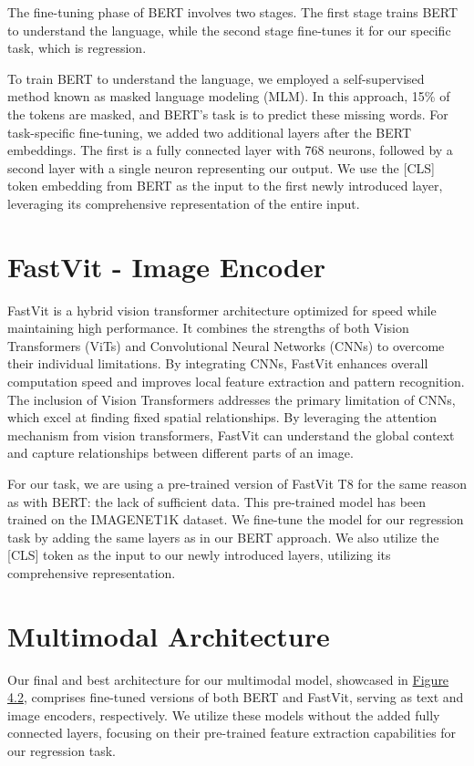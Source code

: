 The fine-tuning phase of BERT involves two stages. The first stage trains BERT to understand the language, while the second stage fine-tunes it for our specific task, which is regression.

To train BERT to understand the language, we employed a self-supervised method known as masked language modeling (MLM). In this approach, 15\% of the tokens are masked, and BERT's task is to predict these missing words. For task-specific fine-tuning, we added two additional layers after the BERT embeddings. The first is a fully connected layer with 768 neurons, followed by a second layer with a single neuron representing our output. We use the [CLS] token embedding from BERT as the input to the first newly introduced layer, leveraging its comprehensive representation of the entire input.

\section{FastVit - Image Encoder}
FastVit \cite{fastvit} is a hybrid vision transformer architecture optimized for speed while maintaining high performance. It combines the strengths of both Vision Transformers (ViTs) and Convolutional Neural Networks (CNNs) to overcome their individual limitations. By integrating CNNs, FastVit enhances overall computation speed and improves local feature extraction and pattern recognition. The inclusion of Vision Transformers addresses the primary 
limitation of CNNs, which excel at finding fixed spatial relationships. By leveraging the attention mechanism from vision transformers, FastVit can understand the global context and capture relationships between different parts of an image.

For our task, we are using a pre-trained version of FastVit T8 for the same reason as with BERT: the lack of sufficient data. This pre-trained model has been trained on the IMAGENET1K dataset. We fine-tune the model for our regression task by adding the same layers as in our BERT approach. We also utilize the [CLS] token as the input to our newly introduced layers, utilizing its comprehensive representation.

\section{Multimodal Architecture}
Our final and best architecture for our multimodal model, showcased in \hyperref[fig:model-architecture]{Figure 4.2}, comprises fine-tuned versions of both BERT and FastVit, serving as text and image encoders, respectively. We utilize these models without the added fully connected layers, focusing on their pre-trained feature extraction capabilities for our regression task.

